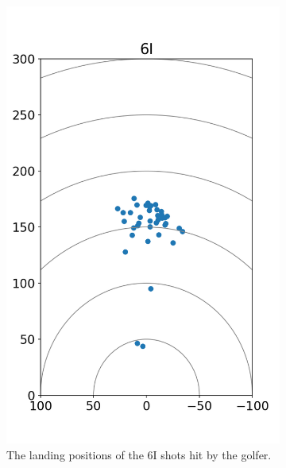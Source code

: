\documentclass{kththesis}
\begin{document}
\begin{figure}
    \centering
    \begin{subfigure}{0.4\textwidth}
    \centering
    \includegraphics[height=0.4\textheight]{Shots/6I_shots.png} 
    \caption{The landing positions of the 6I shots hit by the golfer.}
    \label{fig:6I_shots}
    \end{subfigure}
    \begin{subfigure}{0.4\textwidth}
    \centering

\end{subfigure}
\end{figure}
\end{document}
